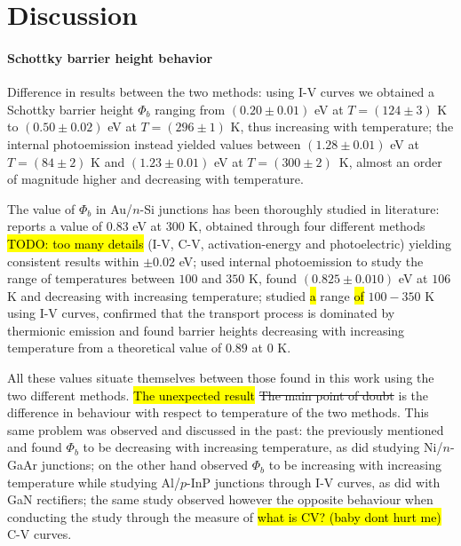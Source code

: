 \newpage %

\section{Discussion}
\paragraph{Schottky barrier height behavior} Difference in results between the two methods:
using I-V curves we obtained a Schottky barrier height $\Phi_b$ ranging from $(0.20 \pm 0.01)$ eV at $T = (124 \pm 3)$ K to $(0.50 \pm 0.02)$ eV at $T = (296 \pm 1)$ K, thus increasing with temperature; 
the internal photoemission instead yielded values between $(1.28 \pm 0.01)$ eV at $T = (84 \pm 2)$ K and $(1.23 \pm 0.01)$ eV at \mbox{$T = (300 \pm 2)$ K}, almost an order of magnitude higher and decreasing with temperature.

The value of $\Phi_b$ in Au/$n$-Si junctions has been thoroughly studied in literature: 
\cite{sze_physics_2007} reports a value of $0.83$ eV at 300 K, obtained through four different methods \hl{TODO: too many details} (I-V, C-V, activation-energy and photoelectric) yielding consistent results within $\pm 0.02$ eV; 
\cite{crowell_equality_1964} used internal photoemission to study the range of temperatures between $100$ and $350$ K, found $(0.825 \pm 0.010)$ eV at $106$ K and decreasing with increasing temperature; 
\cite{arizumi_transport_1969} studied \hl{a} range \hl{of} $100-350$ K using I-V curves, confirmed that the transport process is dominated by thermionic emission and found barrier heights decreasing with increasing temperature from a theoretical value of $0.89$ at $0$ K.

All these values situate themselves between those found in this work using the two different methods. \hl{The unexpected result} \st{The main point of doubt} is the difference in behaviour with respect to temperature of the two methods.
This same problem was observed and discussed in the past:
the previously mentioned \cite{crowell_equality_1964} and \cite{arizumi_transport_1969} found $\Phi_b$ to be decreasing with increasing temperature, as did \cite{hackam_electrical_1972} studying Ni/$n$-GaAr junctions;
\cite{yildirim_temperature-dependent_2010} on the other hand observed $\Phi_b$ to be increasing with increasing temperature while studying Al/$p$-InP junctions through I-V curves, as did \cite{zhou_temperature-dependent_2007} with GaN rectifiers; the same study observed however the opposite behaviour when conducting the study through the measure of \hl{what is CV? (baby dont hurt me)} C-V curves.


